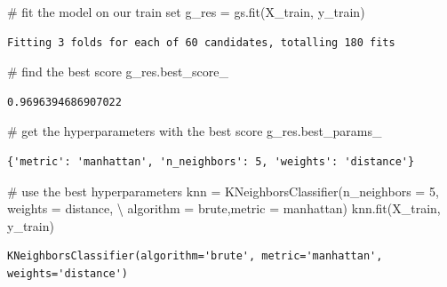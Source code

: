 \documentclass[
  letterpaper,
  DIV=11,
  numbers=noendperiod]{scrreprt}
\newenvironment{Shaded}{\begin{snugshade}}{\end{snugshade}}
\newcommand{\CommentTok}[1]{\textcolor[rgb]{0.37,0.37,0.37}{#1}}
\newcommand{\DecValTok}[1]{\textcolor[rgb]{0.68,0.00,0.00}{#1}}
\newcommand{\NormalTok}[1]{\textcolor[rgb]{0.00,0.23,0.31}{#1}}
\newcommand{\OperatorTok}[1]{\textcolor[rgb]{0.37,0.37,0.37}{#1}}
\newcommand{\StringTok}[1]{\textcolor[rgb]{0.13,0.47,0.30}{#1}}
\begin{document}
\begin{Shaded}
\begin{Highlighting}[]
\CommentTok{\# fit the model on our train set}
\NormalTok{g\_res }\OperatorTok{=}\NormalTok{ gs.fit(X\_train, y\_train)}
\end{Highlighting}
\end{Shaded}

\begin{verbatim}
Fitting 3 folds for each of 60 candidates, totalling 180 fits
\end{verbatim}

\begin{Shaded}
\begin{Highlighting}[]
\CommentTok{\# find the best score}
\NormalTok{g\_res.best\_score\_}
\end{Highlighting}
\end{Shaded}

\begin{verbatim}
0.9696394686907022
\end{verbatim}

\begin{Shaded}
\begin{Highlighting}[]
\CommentTok{\# get the hyperparameters with the best score}
\NormalTok{g\_res.best\_params\_}
\end{Highlighting}
\end{Shaded}

\begin{verbatim}
{'metric': 'manhattan', 'n_neighbors': 5, 'weights': 'distance'}
\end{verbatim}

\begin{Shaded}
\begin{Highlighting}[]
\CommentTok{\# use the best hyperparameters}
\NormalTok{knn }\OperatorTok{=}\NormalTok{ KNeighborsClassifier(n\_neighbors }\OperatorTok{=} \DecValTok{5}\NormalTok{, weights }\OperatorTok{=} \StringTok{\textquotesingle{}distance\textquotesingle{}}\NormalTok{, }\OperatorTok{\textbackslash{}}
\NormalTok{algorithm }\OperatorTok{=} \StringTok{\textquotesingle{}brute\textquotesingle{}}\NormalTok{,metric }\OperatorTok{=} \StringTok{\textquotesingle{}manhattan\textquotesingle{}}\NormalTok{)}
\NormalTok{knn.fit(X\_train, y\_train)}
\end{Highlighting}
\end{Shaded}

\begin{verbatim}
KNeighborsClassifier(algorithm='brute', metric='manhattan', weights='distance')
\end{verbatim}
\end{document}
